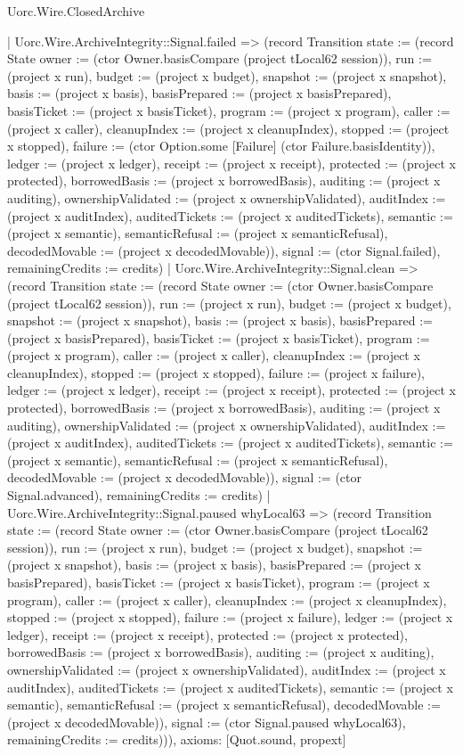 \begin{lexlean}{Uorc.Wire.ClosedArchive}
\begin{semanticmodule}
{    | Uorc.Wire.ArchiveIntegrity::Signal.failed => (record Transition {state := (record State {owner := (ctor Owner.basisCompare (project tLocal62 session)), run := (project x run), budget := (project x budget), snapshot := (project x snapshot), basis := (project x basis), basisPrepared := (project x basisPrepared), basisTicket := (project x basisTicket), program := (project x program), caller := (project x caller), cleanupIndex := (project x cleanupIndex), stopped := (project x stopped), failure := (ctor Option.some [Failure] (ctor Failure.basisIdentity)), ledger := (project x ledger), receipt := (project x receipt), protected := (project x protected), borrowedBasis := (project x borrowedBasis), auditing := (project x auditing), ownershipValidated := (project x ownershipValidated), auditIndex := (project x auditIndex), auditedTickets := (project x auditedTickets), semantic := (project x semantic), semanticRefusal := (project x semanticRefusal), decodedMovable := (project x decodedMovable)}), signal := (ctor Signal.failed), remainingCredits := credits})
    | Uorc.Wire.ArchiveIntegrity::Signal.clean => (record Transition {state := (record State {owner := (ctor Owner.basisCompare (project tLocal62 session)), run := (project x run), budget := (project x budget), snapshot := (project x snapshot), basis := (project x basis), basisPrepared := (project x basisPrepared), basisTicket := (project x basisTicket), program := (project x program), caller := (project x caller), cleanupIndex := (project x cleanupIndex), stopped := (project x stopped), failure := (project x failure), ledger := (project x ledger), receipt := (project x receipt), protected := (project x protected), borrowedBasis := (project x borrowedBasis), auditing := (project x auditing), ownershipValidated := (project x ownershipValidated), auditIndex := (project x auditIndex), auditedTickets := (project x auditedTickets), semantic := (project x semantic), semanticRefusal := (project x semanticRefusal), decodedMovable := (project x decodedMovable)}), signal := (ctor Signal.advanced), remainingCredits := credits})
    | Uorc.Wire.ArchiveIntegrity::Signal.paused whyLocal63 => (record Transition {state := (record State {owner := (ctor Owner.basisCompare (project tLocal62 session)), run := (project x run), budget := (project x budget), snapshot := (project x snapshot), basis := (project x basis), basisPrepared := (project x basisPrepared), basisTicket := (project x basisTicket), program := (project x program), caller := (project x caller), cleanupIndex := (project x cleanupIndex), stopped := (project x stopped), failure := (project x failure), ledger := (project x ledger), receipt := (project x receipt), protected := (project x protected), borrowedBasis := (project x borrowedBasis), auditing := (project x auditing), ownershipValidated := (project x ownershipValidated), auditIndex := (project x auditIndex), auditedTickets := (project x auditedTickets), semantic := (project x semantic), semanticRefusal := (project x semanticRefusal), decodedMovable := (project x decodedMovable)}), signal := (ctor Signal.paused whyLocal63), remainingCredits := credits}))),
  axioms: [Quot.sound, propext]
}


\end{semanticmodule}
\end{lexlean}
